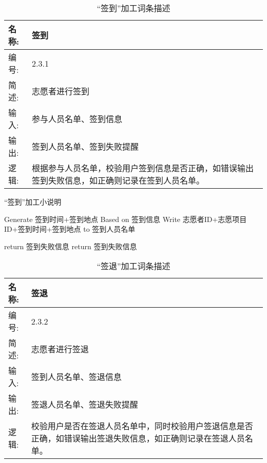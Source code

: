 \begin{table}[H]  
\caption{``签到”加工词条描述}  
\begin{center}  
    \begin{tabular}{l p{11cm}} 
        \hline
        \quad 名称: & 签到\\
        \hline
        \quad 编号: & 2.3.1 \\
        \hline
        \quad 简述: & 志愿者进行签到 \\
        \hline
        \quad 输入:& 参与人员名单、签到信息 \\
        \hline
        \quad 输出:& 签到人员名单、签到失败提醒\\
        \hline
        \quad 逻辑:& 根据参与人员名单，校验用户签到信息是否正确，如错误输出签到失败信息，如正确则记录在签到人员名单。 \\
        \hline
    \end{tabular}
    \label{tab1}
\end{center}
\end{table}

\begin{algorithm}[H]
    \renewcommand{\thealgorithm}{}
    \caption{``签到”加工小说明} 
    \label{alg3} 
    \begin{algorithmic}[1]
        \STATE Generate 签到时间+签到地点 Based on 签到信息
        \STATE Write 志愿者ID+志愿项目ID+签到时间+签到地点 to 签到人员名单
        
        \ELSE return 签到失败信息
        \ENDIF
        \ELSE return 签到失败信息
        \ENDIF
    \end{algorithmic} 
\end{algorithm}


\begin{table}[H]  
\caption{``签退”加工词条描述}  
\begin{center}  
    \begin{tabular}{l p{11cm}} 
        \hline
        \quad 名称: & 签退\\
        \hline
        \quad 编号: & 2.3.2 \\
        \hline
        \quad 简述: & 志愿者进行签退 \\
        \hline
        \quad 输入:& 签到人员名单、签退信息 \\
        \hline
        \quad 输出:& 签退人员名单、签退失败提醒\\
        \hline
        \quad 逻辑:& 校验用户是否在签退人员名单中，同时校验用户签退信息是否正确，如错误输出签退失败信息，如正确则记录在签退人员名单。 \\
        \hline
    \end{tabular}
    \label{tab1}
\end{center}
\end{table}

